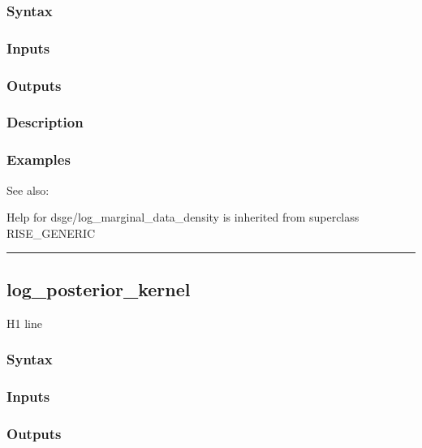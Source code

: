 \documentclass[letterpaper,10pt,english]{sphinxmanual}
\begin{document}
\subsubsection{Syntax}
\label{classes/models/@dsge/dsge:id87}

\subsubsection{Inputs}
\label{classes/models/@dsge/dsge:id88}

\subsubsection{Outputs}
\label{classes/models/@dsge/dsge:id89}

\subsubsection{Description}
\label{classes/models/@dsge/dsge:id90}

\subsubsection{Examples}
\label{classes/models/@dsge/dsge:id91}
See also:

Help for dsge/log\_marginal\_data\_density is inherited from superclass RISE\_GENERIC


\bigskip\hrule{}\bigskip



\subsection{log\_posterior\_kernel}
\label{classes/models/@dsge/dsge:log-posterior-kernel}\label{classes/models/@dsge/dsge:id92}
H1 line


\subsubsection{Syntax}
\label{classes/models/@dsge/dsge:id93}

\subsubsection{Inputs}
\label{classes/models/@dsge/dsge:id94}

\subsubsection{Outputs}
\label{classes/models/@dsge/dsge:id95}
\end{document}
